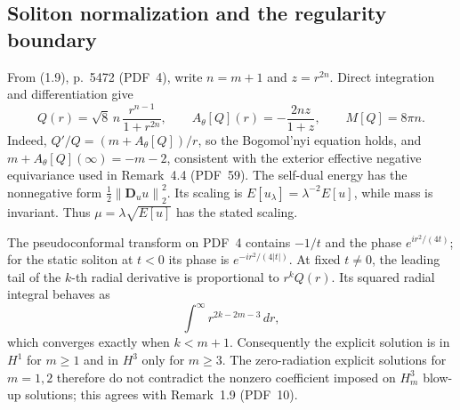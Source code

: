 \documentclass[10pt]{article}
\begin{document}
\subsection*{Soliton normalization and the regularity boundary}
From (1.9), p. 5472 (PDF 4), write \(n=m+1\) and \(z=r^{2n}\). Direct integration and differentiation give \[Q(r)=\sqrt8\,n\,\frac{r^{n-1}}{1+r^{2n}},\qquad
A_\theta[Q](r)=-\frac{2nz}{1+z},\qquad M[Q]=8\pi n.\] Indeed, \(Q'/Q=(m+A_\theta[Q])/r\), so the Bogomol’nyi equation holds, and \(m+A_\theta[Q](\infty)=-m-2\), consistent with the exterior effective negative equivariance used in Remark 4.4 (PDF 59). The self-dual energy has the nonnegative form \(\frac12\left\|\mathbf D_u u\right\|_2^2\). Its scaling is \(E[u_\lambda]=\lambda^{-2}E[u]\), while mass is invariant. Thus \(\mu=\lambda\sqrt{E[u]}\) has the stated scaling.\par
The pseudoconformal transform on PDF 4 contains \(-1/t\) and the phase \(e^{ir^2/(4t)}\); for the static soliton at \(t<0\) its phase is \(e^{-ir^2/(4|t|)}\). At fixed \(t\ne0\), the leading tail of the \(k\)-th radial derivative is proportional to \(r^kQ(r)\). Its squared radial integral behaves as \[\int^\infty r^{2k-2m-3}\,dr,\] which converges exactly when \(k<m+1\). Consequently the explicit solution is in \(H^1\) for \(m\ge1\) and in \(H^3\) only for \(m\ge3\). The zero-radiation explicit solutions for \(m=1,2\) therefore do not contradict the nonzero coefficient imposed on \(H_m^3\) blow-up solutions; this agrees with Remark 1.9 (PDF 10).\par
\end{document}
